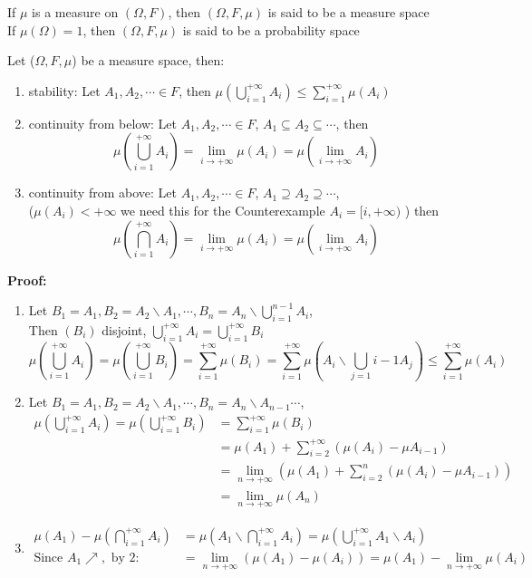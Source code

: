 \begin{definition}[]{}
If $ \mu $ is a measure on $ (\Omega,F) $, then $ (\Omega,F,\mu )$ is said to be a measure space \\
If $ \mu(\Omega)=1 $, then $ (\Omega,F,\mu )$ is said to be a probability space
\end{definition}
\begin{lemma}[]{}
Let ($\Omega,F,\mu$) be a measure space, then:
 \begin{enumerate}[label=\circled{\arabic*}] 
 \item stability: Let $ A_1,A_2,\cdots \in F $, then $ \mu(\bigcup_{i=1}^{+\infty}A_i) \leq \sum_{i=1}^{+\infty}\mu(A_i) $
 \item continuity from below: Let $ A_1,A_2,\cdots \in F $, $ A_1\subseteq A_2\subseteq \cdots $, then $$ \mu(\bigcup_{i=1}^{+\infty}A_i)=\lim_{i\rightarrow+\infty}\mu(A_i)=\mu(\lim_{i\rightarrow+\infty}A_i) $$
 \item continuity from above: Let $ A_1,A_2,\cdots \in F $, $ A_1\supseteq A_2\supseteq \cdots $,\\($ \mu(A_i)<+\infty $ we need this for the Counterexample $ A_i=[i,+\infty) $ ) then $$ \mu(\bigcap_{i=1}^{+\infty}A_i)=\lim_{i\rightarrow+\infty}\mu(A_i)=\mu(\lim_{i\rightarrow+\infty}A_i) $$
  \end{enumerate}
\end{lemma}
\textbf{Proof:}
 \begin{enumerate}[label=\circled{\arabic*}] 
 \item Let $ B_1=A_1,B_2=A_2\backslash A_1,\cdots,B_n=A_n\backslash \bigcup_{i=1}^{n-1}A_i $,
 \\Then $ (B_i) $ disjoint, $ \bigcup_{i=1}^{+\infty}A_i=\bigcup_{i=1}^{+\infty}B_i $   
 $$
    \mu(\bigcup_{i=1}^{+\infty}A_i)=\mu(\bigcup_{i=1}^{+\infty}B_i)=\sum_{i=1}^{+\infty}\mu(B_i)=\sum_{i=1}^{+\infty}\mu(A_i\backslash\bigcup_{j=1}{i-1}A_j)\leq \sum_{i=1}^{+\infty}\mu(A_i)
 $$ 
 \item Let $ B_1=A_1,B_2=A_2\backslash A_1,\cdots,B_n=A_n\backslash A_{n-1}\cdots $, 
 \begin{align*}
    \mu(\bigcup_{i=1}^{+\infty}A_i)=\mu(\bigcup_{i=1}^{+\infty}B_i)&=\sum_{i=1}^{+\infty}\mu(B_i)\\
    &=\mu(A_1)+\sum_{i=2}^{+\infty}(\mu(A_i)- \mu A_{i-1})\\
    &=\lim_{n\rightarrow+\infty}(\mu(A_1)+\sum_{i=2}^{n}(\mu(A_i)- \mu A_{i-1}))\\
    &=\lim_{n\rightarrow+\infty}\mu(A_n)
 \end{align*}
 \item \begin{align*}{}{}
 \mu(A_1)-\mu(\bigcap_{i=1}^{+\infty}A_i)&=\mu(A_1\backslash \bigcap_{i=1}^{+\infty}A_i)=\mu(\bigcup_{i=1}^{+\infty}A_1\backslash A_i)\\
 \text{Since }A_1 \nearrow ,\text{ by 2}: &=\lim_{n\rightarrow+\infty}(\mu(A_1)-\mu(A_i))=\mu(A_1)-\lim_{n\rightarrow+\infty}\mu(A_i)
 \end{align*} 
 \end{enumerate}
